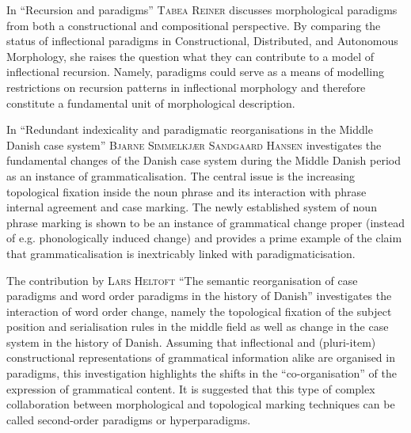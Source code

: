 \documentclass[output=paper]{langsci/langscibook}
\begin{document}
\begin{sloppypar}
In “Recursion and paradigms” \textsc{Tabea} \textsc{Reiner} discusses morphological paradigms from both a constructional and compositional perspective. By comparing the status of inflectional paradigms in Constructional, Distributed, and Autonomous Morphology, she raises the question what they can contribute to a model of inflectional recursion. Namely, paradigms could serve as a means of modelling restrictions on recursion patterns in inflectional morphology and therefore constitute a fundamental unit of morphological description. 
\end{sloppypar}

In “Redundant indexicality and paradigmatic reorganisations in the Middle Danish case system” \textsc{Bjarne} \textsc{Simmelkjær} \textsc{Sandgaard} \textsc{Hansen} investigates the fundamental changes of the Danish case system during the Middle Danish period as an instance of grammaticalisation. The central issue is the increasing topological fixation inside the noun phrase and its interaction with phrase internal agreement and case marking. The newly established system of noun phrase marking is shown to be an instance of grammatical change proper (instead of e.g. phonologically induced change) and provides a prime example of the claim that grammaticalisation is inextricably linked with paradigmaticisation.

The contribution by \textsc{Lars Heltoft} “The semantic reorganisation of case paradigms and word order paradigms in the history of Danish” investigates the interaction of word order change, namely the topological fixation of the subject position and serialisation rules in the middle field as well as change in the case system in the history of Danish. Assuming that inflectional and (pluri-item) constructional representations of grammatical information alike are organised in paradigms, this investigation highlights the shifts in the “co-organisation” of the expression of grammatical content. It is suggested that this type of complex collaboration between morphological and topological marking techniques can be called second-order paradigms or hyperparadigms.
\end{document}
